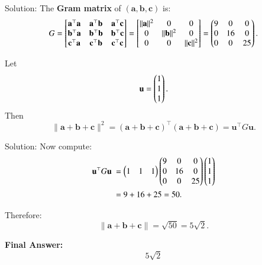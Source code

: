 \documentclass{beamer}
\begin{document}
\begin{frame}{Solution:}
The \textbf{Gram matrix} of $ (\mathbf{a}, \mathbf{b}, \mathbf{c}) $ is:
\begin{equation} \label{eq10}
G =
\begin{bmatrix}
\mathbf{a}^\top \mathbf{a} & \mathbf{a}^\top \mathbf{b} & \mathbf{a}^\top \mathbf{c} \\
\mathbf{b}^\top \mathbf{a} & \mathbf{b}^\top \mathbf{b} & \mathbf{b}^\top \mathbf{c} \\
\mathbf{c}^\top \mathbf{a} & \mathbf{c}^\top \mathbf{b} & \mathbf{c}^\top \mathbf{c}
\end{bmatrix}
=
\begin{bmatrix}
\|\mathbf{a}\|^2 & 0 & 0 \\
0 & \|\mathbf{b}\|^2 & 0 \\
0 & 0 & \|\mathbf{c}\|^2
\end{bmatrix}
=
\begin{pmatrix}
9 & 0 & 0 \\
0 & 16 & 0 \\
0 & 0 & 25
\end{pmatrix}.
\end{equation}

Let
\[
\mathbf{u} = \begin{pmatrix}1 \\ 1 \\ 1\end{pmatrix}.
\]
Then
\begin{equation} \label{eq11}
\|\mathbf{a} + \mathbf{b} + \mathbf{c}\|^2 = (\mathbf{a} + \mathbf{b} + \mathbf{c})^\top (\mathbf{a} + \mathbf{b} + \mathbf{c}) = \mathbf{u}^\top G \mathbf{u}.
\end{equation}
\end{frame}

\begin{frame}{Solution:}
Now compute:
\begin{align}
\mathbf{u}^\top G \mathbf{u} 
&= \myvec{1 & 1 & 1}
\myvec{
9 & 0 & 0 \\
0 & 16 & 0 \\
0 & 0 & 25
}
\myvec{1 \\ 1 \\ 1} \nonumber \\
&= 9 + 16 + 25 = 50. \label{eq12}
\end{align}

Therefore:
\begin{equation} \label{eq13}
\|\mathbf{a} + \mathbf{b} + \mathbf{c}\| = \sqrt{50} = 5\sqrt{2}.
\end{equation}

\bigskip

\textbf{Final Answer:}
\[
\boxed{5\sqrt{2}}
\]
\end{frame}
\end{document}
